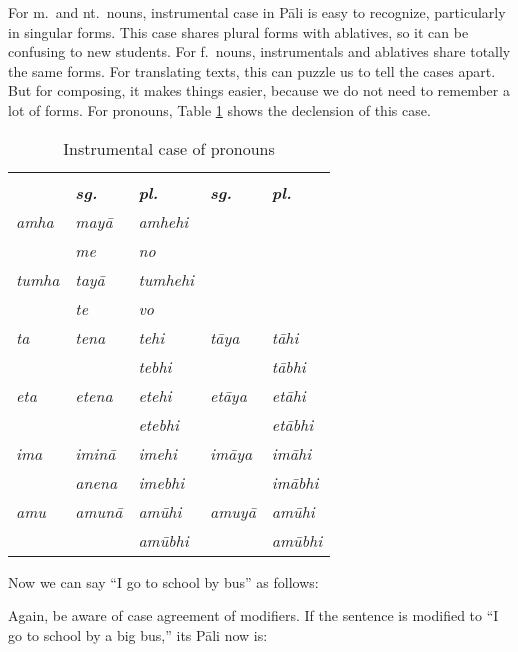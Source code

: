 For m.\ and nt.\ nouns, instrumental case in P\=ali is easy to recognize, particularly in singular forms. This case shares plural forms with ablatives, so it can be confusing to new students. For f.\ nouns, instrumentals and ablatives share totally the same forms. For translating texts, this can puzzle us to tell the cases apart. But for composing, it makes things easier, because we do not need to remember a lot of forms. For pronouns, Table \ref{tab:inspron} shows the declension of this case.

\begin{table}[!hbt]
\centering
\caption{Instrumental case of pronouns}
\label{tab:inspron}
\bigskip
\begin{tabular}{@{}*{5}{>{\itshape}l}@{}} \toprule
\multirow{2}{*}{\bfseries\upshape Pron.} & \multicolumn{2}{c}{\bfseries\upshape m./nt.} & \multicolumn{2}{c}{\bfseries\upshape f.} \\
\cmidrule(lr){2-3} \cmidrule(lr){4-5}
& \bfseries\upshape sg. & \bfseries\upshape pl. & \bfseries\upshape sg. & \bfseries\upshape pl. \\
\midrule
amha & may\=a & amhehi & & \\
& me & no & & \\
tumha & tay\=a & tumhehi & & \\
& te & vo & & \\
ta & tena & tehi & t\=aya & t\=ahi\\
& & tebhi & & t\=abhi \\
eta & etena & etehi & et\=aya & et\=ahi \\
& & etebhi & & et\=abhi \\
ima & imin\=a & imehi & im\=aya & im\=ahi \\
& anena & imebhi & & im\=abhi \\
amu & amun\=a & am\=uhi & amuy\=a & am\=uhi \\
& & am\=ubhi & & am\=ubhi \\
\bottomrule
\end{tabular}
\end{table}

Now we can say ``I go to school by bus'' as follows:


Again, be aware of case agreement of modifiers. If the sentence is modified to ``I go to school by a big bus,'' its P\=ali now is:


